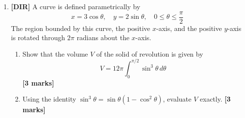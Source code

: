 \documentclass[11pt,a4paper]{article}
\begin{document}
\begin{enumerate}
\item \textbf{[DIR]} A curve is defined parametrically by
\[
x = 3\cos\theta, \quad y = 2\sin\theta, \quad 0 \le \theta \le \frac{\pi}{2}
\]
The region bounded by this curve, the positive $x$-axis, and the positive $y$-axis is rotated through $2\pi$ radians about the $x$-axis.
\begin{enumerate}[label=(\alph*)]
  \item Show that the volume $V$ of the solid of revolution is given by
  \[
  V = 12\pi \int_0^{\pi/2} \sin^3\theta \, d\theta
  \]
  \hfill{\textbf{[3 marks]}}
  \item Using the identity $\sin^3\theta = \sin\theta(1 - \cos^2\theta)$, evaluate $V$ exactly. \hfill{\textbf{[3 marks]}}
\end{enumerate}

\end{enumerate}
\end{document}
